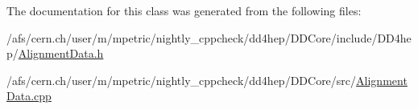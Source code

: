 The documentation for this class was generated from the following files\+:\begin{DoxyCompactItemize}
\item 
/afs/cern.\+ch/user/m/mpetric/nightly\+\_\+cppcheck/dd4hep/\+D\+D\+Core/include/\+D\+D4hep/\hyperlink{_alignment_data_8h}{Alignment\+Data.\+h}\item 
/afs/cern.\+ch/user/m/mpetric/nightly\+\_\+cppcheck/dd4hep/\+D\+D\+Core/src/\hyperlink{_alignment_data_8cpp}{Alignment\+Data.\+cpp}\end{DoxyCompactItemize}
